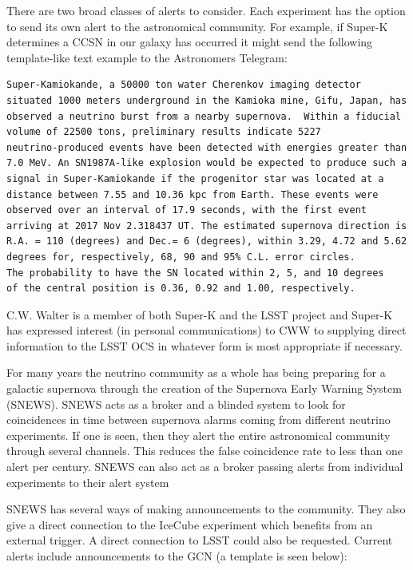\documentclass[11pt, letterpaper]{article}
\newcommand{\superk}  {Super\nobreakdash-K\xspace}
\begin{document}
There are two broad classes of alerts to consider.  Each experiment
has the option to send its own alert to the astronomical community.
For example, if \superk determines a CCSN in our galaxy has occurred
it might send the following template-like text example to the Astronomers
Telegram:

\begin{verbatim}
Super-Kamiokande, a 50000 ton water Cherenkov imaging detector
situated 1000 meters underground in the Kamioka mine, Gifu, Japan, has
observed a neutrino burst from a nearby supernova.  Within a fiducial
volume of 22500 tons, preliminary results indicate 5227
neutrino-produced events have been detected with energies greater than
7.0 MeV. An SN1987A-like explosion would be expected to produce such a
signal in Super-Kamiokande if the progenitor star was located at a
distance between 7.55 and 10.36 kpc from Earth. These events were
observed over an interval of 17.9 seconds, with the first event
arriving at 2017 Nov 2.318437 UT. The estimated supernova direction is
R.A. = 110 (degrees) and Dec.= 6 (degrees), within 3.29, 4.72 and 5.62
degrees for, respectively, 68, 90 and 95% C.L. error circles. 
The probability to have the SN located within 2, 5, and 10 degrees 
of the central position is 0.36, 0.92 and 1.00, respectively.
\end{verbatim}

C.W. Walter is a member of both \superk and the LSST project and
\superk has expressed interest (in personal communications) to CWW to
supplying direct information to the LSST OCS in whatever form is most
appropriate if necessary.

For many years the neutrino community as a whole has being preparing
for a galactic supernova through the creation of the Supernova Early
Warning System (SNEWS).  SNEWS acts as a
broker and a blinded system to look for coincidences in time between
supernova alarms coming from different neutrino experiments. If one is
seen, then they alert the entire astronomical community through several
channels. This reduces the false coincidence rate to less than one
alert per century. SNEWS can also act as a broker passing alerts from
individual experiments to their alert system

SNEWS has several ways of making announcements to the community.  They
also give a direct connection to the IceCube experiment which benefits
from an external trigger.  A direct connection to LSST could also be
requested.  Current  alerts include announcements to the GCN (a
template is seen below):
\end{document}
